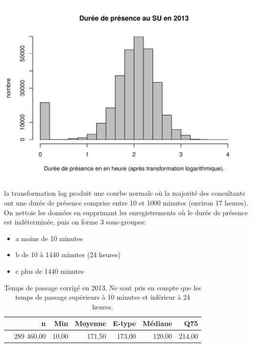 \documentclass[12pt,english,french,twoside]{book}\usepackage[]{graphicx}\usepackage[]{color}
\makeatletter
\def\maxwidth{ %
  \ifdim\Gin@nat@width>\linewidth
    \linewidth
  \else
    \Gin@nat@width
  \fi
}
\newenvironment{knitrout}{}{} %
\makeatother
\begin{document}
\begin{center}
\begin{knitrout}
\color{fgcolor}
\includegraphics[width=\maxwidth]{figure/log_passages-1} 

\end{knitrout}
\end{center}

la transformation log produit une courbe normale où la majorité des consultants ont une durée de présence comprise entre 10 et 1000 minutes (environ 17 heures). On nettoie les données en supprimant les enregistrements où le durée de présence est indéterminée, puis on forme 3 sous-groupes:
\begin{itemize}
  \item a moins de 10 minutes
  \item b de 10 à 1440 minutes (24 heures)
  \item c plus de 1440 minutes
\end{itemize}

\begin{table}[ht]
\centering
\begin{tabular}{rrrrrrr}
  \hline
 & n & Min & Moyenne & E-type & Médiane & Q75 \\ 
  \hline
 & 289 460,00 & 10,00 & 171,50 & 173,00 & 120,00 & 214,00 \\ 
   \hline
\end{tabular}
\caption[temps de passage corrigé]{Temps de passage corrigé en 2013. Ne sont pris en compte que les temps de passage supérieurs à 10 minutes et inférieur à 24 heures.} 
\label{lab:temps_corrige}
\end{table}
\end{document}
